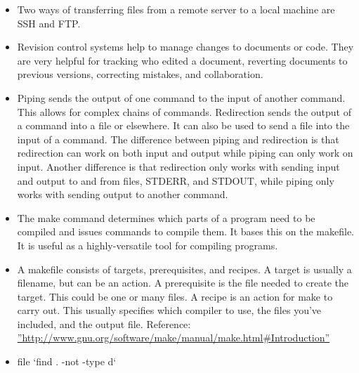 \documentclass[letterpaper,10pt,titlepage]{article}
\begin{document}
\begin{itemize}
\item Two ways of transferring files from a remote server to a local machine are SSH and FTP.
\item Revision control systems help to manage changes to documents or code. They are very helpful for tracking who edited a document, reverting documents to previous versions, correcting mistakes, and collaboration.
\item Piping sends the output of one command to the input of another command. This allows for complex chains of commands. Redirection sends the output of a command into a file or elsewhere. It can also be used to send a file into the input of a command. The difference between piping and redirection is that redirection can work on both input and output while piping can only work on input. Another difference is that redirection only works with sending input and output to and from files, STDERR, and STDOUT, while piping only works with sending output to another command.
\item The make command determines which parts of a program need to be compiled and issues commands to compile them. It bases this on the makefile. It is useful as a highly-versatile tool for compiling programs.
\item A makefile consists of targets, prerequisites, and recipes. A target is usually a filename, but can be an action. A prerequisite is the file needed to create the target. This could be one or many files. A recipe is an action for make to carry out. This usually specifies which compiler to use, the files you’ve included, and the output file. Reference: \hyperref[http://www.gnu.org/software/make/manual/make.html#Introduction]{''http://www.gnu.org/software/make/manual/make.html#Introduction''}
\item file `find . -not -type d`
\end{itemize}
\end{document}

